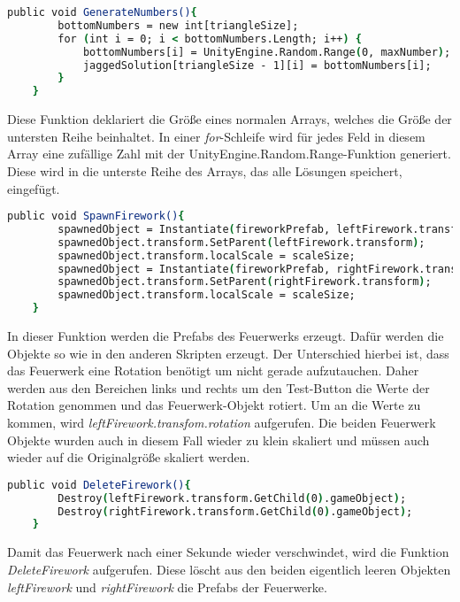 \begin{lstlisting}[language=csh, caption={Triangle.cs GenerateNumbers-Funktion}]
	public void GenerateNumbers(){
		bottomNumbers = new int[triangleSize];
		for (int i = 0; i < bottomNumbers.Length; i++) {
			bottomNumbers[i] = UnityEngine.Random.Range(0, maxNumber);
			jaggedSolution[triangleSize - 1][i] = bottomNumbers[i];
		}
	}
\end{lstlisting}
Diese Funktion deklariert die Größe eines normalen Arrays, welches die Größe der untersten Reihe beinhaltet. In einer \textit{for}-Schleife wird für jedes Feld in diesem Array eine zufällige Zahl mit der UnityEngine.Random.Range-Funktion generiert. Diese wird in die unterste Reihe des Arrays, das alle Lösungen speichert, eingefügt.\\
\begin{lstlisting}[language=csh, caption={Triangle.cs SpawnFirework-Funktion}]
	public void SpawnFirework(){
		spawnedObject = Instantiate(fireworkPrefab, leftFirework.transform.position, leftFirework.transform.rotation);
		spawnedObject.transform.SetParent(leftFirework.transform);
		spawnedObject.transform.localScale = scaleSize;
		spawnedObject = Instantiate(fireworkPrefab, rightFirework.transform.position, rightFirework.transform.rotation);
		spawnedObject.transform.SetParent(rightFirework.transform);
		spawnedObject.transform.localScale = scaleSize;
	}
\end{lstlisting}
In dieser Funktion werden die Prefabs des Feuerwerks erzeugt. Dafür werden die Objekte so wie in den anderen Skripten erzeugt. Der Unterschied hierbei ist, dass das Feuerwerk eine Rotation benötigt um nicht gerade aufzutauchen. Daher werden aus den Bereichen links und rechts um den Test-Button die Werte der Rotation genommen und das Feuerwerk-Objekt rotiert. Um an die Werte zu kommen, wird \textit{leftFirework.transfom.rotation} aufgerufen. Die beiden Feuerwerk Objekte wurden auch in diesem Fall wieder zu klein skaliert und müssen auch wieder auf die Originalgröße skaliert werden.\\
\begin{lstlisting}[language=csh, caption={Triangle.cs DeleteFirework-Funktion}]
	public void DeleteFirework(){
		Destroy(leftFirework.transform.GetChild(0).gameObject);
		Destroy(rightFirework.transform.GetChild(0).gameObject);
	}
\end{lstlisting}
Damit das Feuerwerk nach einer Sekunde wieder verschwindet, wird die Funktion \textit{DeleteFirework} aufgerufen. Diese löscht aus den beiden eigentlich leeren Objekten \textit{leftFirework} und \textit{rightFirework} die Prefabs der Feuerwerke.\\
